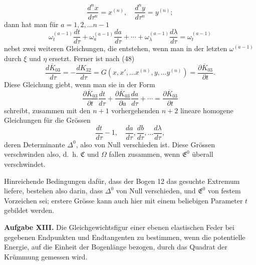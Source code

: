 \documentclass[11pt,a4paper,leqno]{article}
\begin{document}
\[
\frac{d^nx}{d\tau^n}=x^{(n)},\quad
\frac{d^ny}{d\tau^n}=y^{(n)};
\]
dann hat man für $a=1,2,\ldots n-1$
\[
\omega_t^{(a-1)}\frac{dt}{d\tau}
+\omega_a^{(a-1)}\frac{da}{d\tau}
+\cdots+\omega_\lambda^{(a-1)}\frac{d\lambda}{d\tau}
=\omega_t^{(a-1)}
\]
nebst zwei weiteren Gleichungen, die entstehen, wenn man in der letzten $\omega^{(a-1)}$ durch $\xi$ und $\eta$ ersetzt. Ferner ist nach (48)
\[
\frac{d\overline{K}_{03}}{d\tau}
=-\frac{dK_{32}}{d\tau}
=G(x,x',\ldots x^{(n)},y,\ldots y^{(n)})
=\frac{\partial\overline{K}_{03}}{\partial t}.
\]
Diese Gleichung giebt, wenn man sie in der Form
\[
\frac{\partial\overline{K}_{03}}{\partial t}\frac{dt}{d\tau}
+\frac{\partial\overline{K}_{03}}{\partial a}\frac{da}{d\tau}
+\cdots
=\frac{\partial\overline{K}_{03}}{\partial t}
\]
schreibt, zusammen mit den $n+1$ vorhergehenden $n+2$ lineare homogene Gleichungen für die Grössen
\[
\frac{dt}{d\tau}-1,\quad \frac{da}{d\tau},\frac{db}{d\tau},\ldots\frac{d\lambda}{d\tau},
\]
deren Determinante $\Delta^0$, also von Null verschieden ist. Diese Grössen verschwinden also, d.~h. $\mathfrak{C}$ und $\Omega$ fallen zusammen, wenn $\mathfrak{E}^0$ überall verschwindet.

Hinreichende Bedingungen dafür, dass der Bogen 12 das gesuchte Extremum liefere, bestehen also darin, dass $\Delta^0$ von Null verschieden, und $\mathfrak{E}^0$ von festem Vorzeichen sei; erstere Grösse kann auch hier mit einem beliebigen Parameter $t$ gebildet werden.

\noindent\textbf{Aufgabe XIII.} Die Gleichgewichtsfigur einer ebenen elastischen Feder bei gegebenen Endpunkten und Endtangenten zu bestimmen, wenn die potentielle Energie, auf die Einheit der Bogenlänge bezogen, durch das Quadrat der Krümmung gemessen wird.
\end{document}
